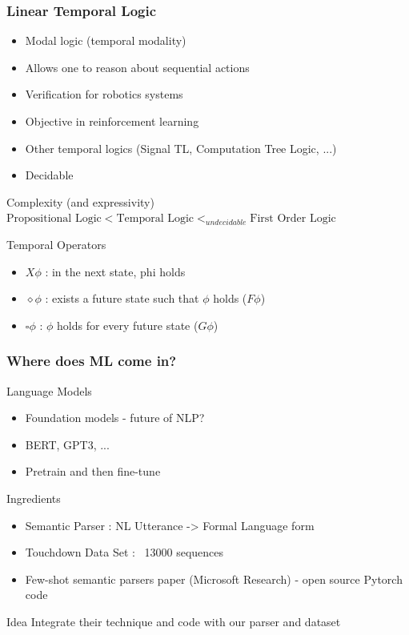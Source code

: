 \documentclass{beamer}
\begin{document}
\begin{frame}
\frametitle{Linear Temporal Logic}

\begin{itemize}
\item Modal logic (temporal modality)
\item Allows one to reason about sequential actions
\item Verification for robotics systems
\item Objective in reinforcement learning
\item Other temporal logics (Signal TL, Computation Tree Logic, ...)
\item Decidable 
\end{itemize}

\begin{block}{Complexity (and expressivity)}
$\text{Propositional Logic} < \text{Temporal Logic} <_{undecidable} \text{First Order Logic}$
\end{block}

\begin{exampleblock}{Temporal Operators}
\begin{itemize}
\item $X \phi$ : in the next state, phi holds
\item $\diamond \phi$ : exists a future state such that $\phi$ holds ($F \phi$)
\item $\square \phi$ : $\phi$ holds for every future state ($G \phi$)
\end{itemize}
\end{exampleblock}

\end{frame}

\begin{frame}
\frametitle{Where does ML come in?}

\begin{exampleblock}{Language Models}
\begin{itemize}
\item Foundation models - future of NLP?
\item BERT, GPT3, ...
\item Pretrain and then fine-tune
\end{itemize}
\end{exampleblock}

\begin{block}{Ingredients}
\begin{itemize}
\item Semantic Parser : NL Utterance -> Formal Language form
\item Touchdown Data Set : ~13000 sequences
\item Few-shot semantic parsers paper (Microsoft Research) - open source Pytorch code
\end{itemize}
\end{block}

\begin{alertblock}{Idea}
Integrate their technique and code with our parser and dataset
\end{alertblock}

\end{frame}
\end{document}
